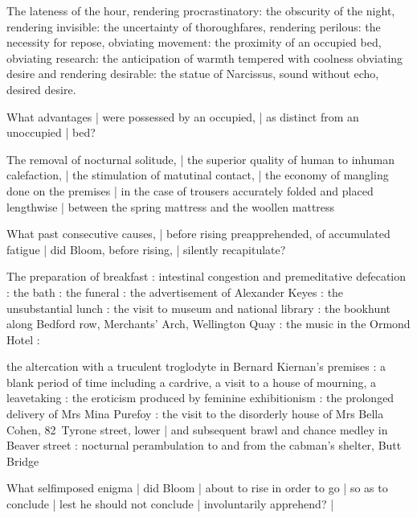 \Turns
The lateness of the hour, rendering procrastinatory:
the obscurity of the night, rendering invisible:
the uncertainty of thoroughfares, rendering perilous:
the necessity for repose, obviating movement:
the proximity of an occupied bed, obviating research:
the anticipation of warmth
tempered with coolness
obviating desire and rendering desirable:
the statue of Narcissus,
sound without echo,
desired desire.


What advantages |
were possessed by an occupied, |
as distinct from an unoccupied |
bed?

\Household
The removal of nocturnal solitude, |
the superior quality of human
to inhuman
calefaction, |
the stimulation of matutinal contact, |
the economy of mangling done on the premises |
in the case of trousers accurately folded and placed lengthwise |
between the spring mattress
and the woollen mattress


What past consecutive causes, |
before rising preapprehended,
of accumulated fatigue |
did Bloom,
before rising, |
silently recapitulate?

\Religious
The preparation of breakfast
:
intestinal congestion and premeditative defecation
:
the bath
:
the funeral
:
the advertisement of Alexander Keyes
:
the unsubstantial lunch
:
the visit to museum and national library
:
the bookhunt along Bedford row, Merchants' Arch, Wellington Quay
:
the music in the Ormond Hotel
:

\Memories
the altercation with a truculent troglodyte in Bernard Kiernan's premises
:
a blank period of time including a cardrive,
a visit to a house of mourning,
a leavetaking
:
the eroticism produced by feminine exhibitionism
:
the prolonged delivery of Mrs Mina Purefoy
:
the visit to the disorderly house of Mrs Bella Cohen,
82~Tyrone street, lower |
and subsequent brawl and chance medley in Beaver street
:
nocturnal perambulation to and from the cabman's shelter, Butt Bridge



What selfimposed enigma |
did Bloom |
about to rise in order to go |
so as to conclude |
lest he should not conclude |
involuntarily apprehend? |

